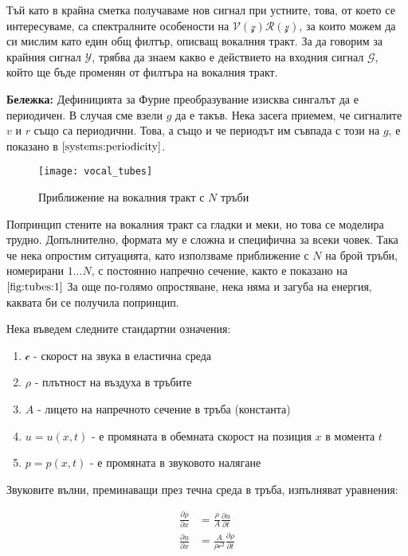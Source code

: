 \documentclass[main.tex]{subfiles}
\begin{document}
Тъй като в крайна сметка получаваме нов сигнал при устните, това, от което се интересуваме, са спектралните особености на $\mathcal{V}(\mathcal{z})\mathcal{R}(\mathcal{z})$, за които можем да си мислим като един общ филтър, описващ вокалния тракт. За да говорим за крайния сигнал $\mathcal{Y}$, трябва да знаем какво е действието на входния сигнал $\mathcal{G}$, който ще бъде променян от филтъра на вокалния тракт. 

\begin{footnotesize}
    \textbf{Бележка:} Дефиницията за Фурие преобразувание изисква сингалът да е периодичен. В случая сме взели $g$ да е такъв. Нека засега приемем, че сигналите $v$ и $r$ също са периодични. Това, а също и че периодът им съвпада с този на $g$, е показано в $\autoref{systems:periodicity}$.
\end{footnotesize}

\begin{figure}[ht]%
    \texttt{[image: vocal\_tubes]}%
    \caption{Приближение на вокалния тракт с $N$ тръби}%
    \label{fig:tubes:1}
\end{figure}

Попринцип стените на вокалния тракт са гладки и меки, но това се моделира трудно. Допълнително, формата му е сложна и специфична за всеки човек. Така че нека опростим ситуацията, като използваме приближение с $N$ на брой тръби, номерирани $1...N$, с постоянно напречно сечение, както е показано на $\autoref{fig:tubes:1}$
За още по-голямо опростяване, нека няма и загуба на енергия, каквата би се получила попринцип.


Нека въведем следните стандартни означения:
\begin{enumerate}
    \item{$\mathcal{c}$} - скорост на звука в еластична среда
    \item{$\rho$} - плътност на въздуха в тръбите
    \item{$A$} - лицето на напречното сечение в тръба (константа)
    \item{$u = u(x, t)$} - е промяната в обемната скорост на позиция $x$ в момента $t$
    \item{$p = p(x, t)$} - е промяната в звуковото налягане
\end{enumerate}

Звуковите вълни, преминаващи през течна среда в
тръба, изпълняват уравнения:

\begin{subequations}
    \label{eq:tubes:01}
    \begin{flalign}
        \frac{\partial\rho}{\partial x} & = \frac{\rho}{A} \frac{\partial u}{\partial t}\\
        \frac{\partial u}{\partial x} & = \frac{A}{\rho \mathcal{c}^2} \frac{\partial \rho}{\partial t}
    \end{flalign}
\end{subequations}
\end{document}
